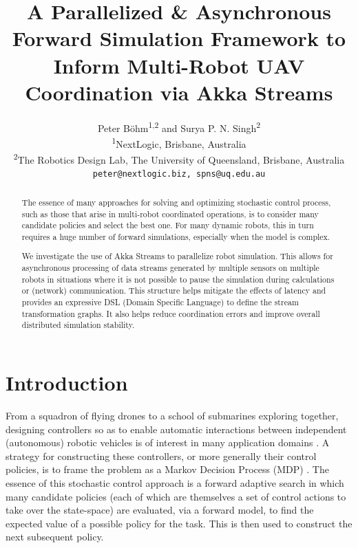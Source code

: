 \documentclass{article}
\title{A Parallelized \& Asynchronous Forward Simulation Framework to Inform Multi-Robot UAV Coordination via Akka Streams}
\author{Peter Böhm\textsuperscript{1,2} and Surya P. N. Singh\textsuperscript{2}
\\ \textsuperscript{1}NextLogic, Brisbane, Australia
\\ \textsuperscript{2}The Robotics Design Lab, The University of Queensland, Brisbane, Australia
\\ {\texttt{peter@nextlogic.biz, spns@uq.edu.au}}}
\let\cite\citep
\begin{document}
\maketitle

\begin{abstract}
The essence of many approaches for solving and optimizing stochastic control process, such as those that arise in multi-robot coordinated operations, is to consider many candidate policies and select the best one.  For many dynamic robots, this in turn requires a huge number of forward simulations, especially when the model is complex.

We investigate the use of Akka Streams to parallelize robot simulation. This allows for asynchronous processing of data streams generated by multiple sensors on multiple robots in situations where it is not possible to pause the simulation during calculations or (network) communication. 
This structure helps mitigate the effects of latency and provides an expressive DSL (Domain Specific Language) to define the stream transformation graphs.  It also helps reduce coordination errors and improve overall distributed simulation stability.  
\end{abstract}


\section{Introduction}

From a squadron of flying drones to a school of submarines exploring together, designing controllers so as to enable automatic interactions between independent (autonomous) robotic vehicles is of interest in many application domains \cite{autohelitrack}.  A strategy for constructing these controllers, or more generally their control policies, is to frame the problem as a Markov Decision Process (MDP) \cite{howard1960dynamic}.  The essence of this stochastic control approach is a forward adaptive search in which many candidate {policies} (each of which are themselves a set of control actions to take over the state-space) are evaluated, via a forward model, to find the expected value of a possible policy for the task.  This is then used to construct the next subsequent policy.
\end{document}

